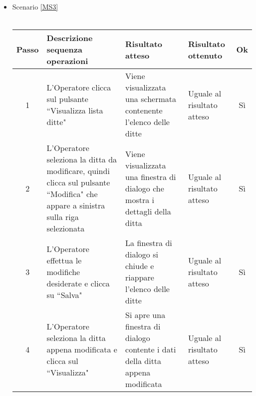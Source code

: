 \begin{itemize}
 \item Scenario \ref{MS3}\\\\
 {
 \footnotesize
  \begin{longtable}{|c|p{3cm}|p{3cm}|p{3cm}|c|}
    \hline
    Passo & Descrizione sequenza operazioni & Risultato atteso & Risultato ottenuto & Ok\\
    \hline
    1 & L'Operatore clicca sul pulsante ``Visualizza lista ditte" & Viene visualizzata una schermata contenente l'elenco delle ditte & Uguale 
      al risultato atteso& Sì\\
    \hline
    2 & L'Operatore seleziona la ditta da modificare, quindi clicca sul pulsante ``Modifica" che appare a sinistra sulla riga selezionata & Viene visualizzata una finestra di dialogo che mostra i dettagli
    della ditta& Uguale al risultato atteso & Sì\\
    \hline
    3 & L'Operatore effettua le modifiche desiderate e clicca su ``Salva"& La finestra di dialogo si chiude e riappare l'elenco delle ditte & Uguale al risultato atteso & Sì\\
    \hline
    4 & L'Operatore seleziona la ditta appena modificata e clicca sul ``Visualizza" & Si apre una finestra di dialogo contente i dati della ditta appena modificata & Uguale al risultato atteso& Sì\\
    \hline
\end{longtable}
}


\end{itemize}
